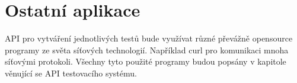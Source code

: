 \section{Ostatní aplikace}
API pro vytváření jednotlivých testů bude využívat různé převážně opensource programy ze světa síťových technologií. Například curl pro komunikaci mnoha síťovými protokoli. Všechny tyto použité programy budou popsány v kapitole věnující se API testovacího systému.

\endinput
